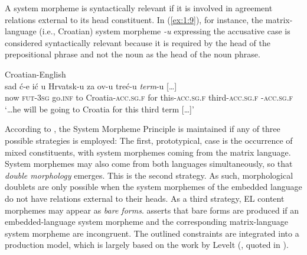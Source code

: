 \noindent A system morpheme is syntactically relevant if it is involved in agreement relations external to its head constituent. In (\ref{ex:1:9}), for instance, the matrix-language (i.e., Croatian) system morpheme \textit{-u} expressing the accusative case is considered  syntactically relevant because it is required by the head of the prepositional phrase and not the noun as the head of the noun phrase.

\ea{\label{ex:1:9}}
Croatian-English \citep[115]{hlavac-second-generation-2003}\\
\gll {\dots} sad ć-e ić u Hrvatsk-u za ov-u treć-u \textit{term}-u [{\dots}]\\
	{} now \textsc{fut-3sg} go.\textsc{inf} to Croatia-\textsc{acc.sg.f} for this-\textsc{acc.sg.f} third-\textsc{acc.sg.f} \phantom{term}-\textsc{acc.sg.f}\\
\glt `\dots he will be going to Croatia for this third term [\dots]'
\z

According to \citet[110]{myers-scotton-duelling-1993}, the System Morpheme Principle is maintained if any of three possible strategies is employed: The first, prototypical, case is the occurrence of mixed constituents, with system morphemes coming from the matrix language. System morphemes may also come from both languages simultaneously, so that \textit{double morphology} emerges. This is the second strategy. As such, morphological doublets are only possible when the system morphemes of the embedded language do not have relations external to their heads. As a third strategy, EL content morphemes may appear as \textit{bare forms}. \citet[112]{myers-scotton-duelling-1993} asserts that bare forms are produced if an embedded-language system morpheme and the corresponding matrix-language system morpheme are incongruent. The outlined constraints are integrated into a production model, which is largely based on the work by Levelt (\citeyear{levelt89}, quoted in \citealt[][]{myers-scotton-duelling-1993}).

